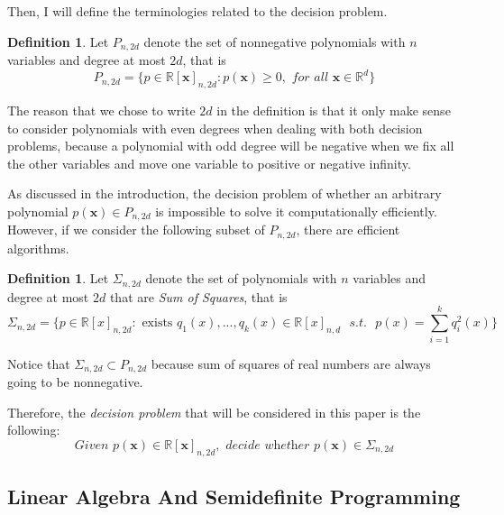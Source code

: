 \documentclass[12pt]{amsart}
\numberwithin{equation}{section}
\theoremstyle{definition}
\newtheorem{definition}[thm]{Definition}
\numberwithin{thm}{section}
\begin{document}
Then, I will define the terminologies related to the decision problem.

\begin{definition}
     \label{def:NGP}
     Let $P_{n, 2d}$ denote the set of nonnegative polynomials with 
     $n$ variables and degree at most $2d$, that is 
     \begin{equation*}
          P_{n, 2d} = \{ p \in \mathbb{R}[\mathbf{x}]_{n, 2d}: p(\mathbf{x}) \geq 0, \textit{ for all } \mathbf{x} \in \mathbb{R}^d \}
     \end{equation*}
\end{definition}

The reason that we chose to write $2d$ in the definition is that it only make sense to consider polynomials with even degrees when dealing with both decision problems, 
because a polynomial with odd degree will be negative when we fix all the other variables and move one variable to positive or negative infinity. 

As discussed in the introduction, the decision problem of whether an arbitrary polynomial $p(\mathbf{x}) \in P_{n, 2d}$ is impossible to solve it computationally efficiently.
However, if we consider the following subset of $P_{n, 2d}$, there are efficient algorithms. 

\begin{definition}
     \label{def:SOS}
          Let $\Sigma_{n,2d}$ denote the set of polynomials with $n$ variables and degree at most
          $2d$ that are \emph{Sum of Squares}, that is
          \begin{equation*}
               \Sigma_{n, 2d} = \{ p \in \mathbb{R}[x]_{n, 2d}: \text{ exists } q_1(x), ..., q_k(x) \in \mathbb{R}[x]_{n,d} \text{ } s.t. \text{ }  p(x) = \sum_{i=1}^k q_i^2(x)\}
          \end{equation*}     
\end{definition}

Notice that $\Sigma_{n,2d} \subset P_{n, 2d}$ because sum of squares of real numbers are always going to be nonnegative. 

Therefore, the \emph{decision problem} that will be considered in this paper is the following: 
\begin{equation}
     \textit{Given } p(\mathbf{x}) \in \mathbb{R}[\mathbf{x}]_{n, 2d}, \textit{ decide whether } p(\mathbf{x}) \in \Sigma_{n, 2d} \label{eq:dp}
\end{equation}


\subsection{Linear Algebra And Semidefinite Programming}
\label{Sec:Linear Algebra}
\end{document}
